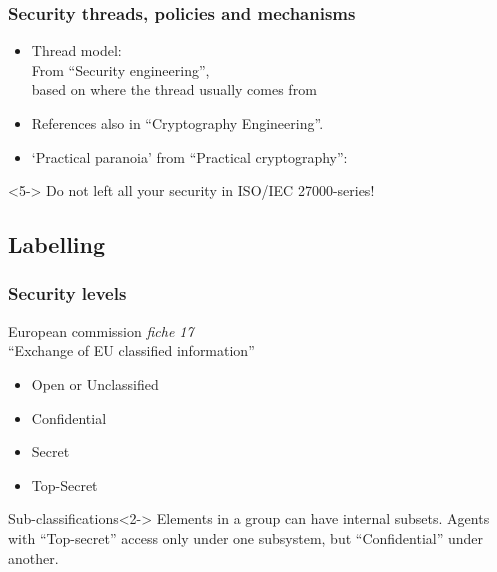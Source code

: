 \documentclass{beamer}
\begin{document}
\begin{frame}
\frametitle{Security threads, policies and mechanisms}
    \begin{itemize}
        \item Thread model:\\From ``Security engineering''\cite{SecEngRossAnderson},\\based on where the thread usually comes from
        \item<3-> References also in ``Cryptography Engineering''\cite{cryptoEngineering}.
        \item<4-> `Practical paranoia' from ``Practical cryptography''\cite{PractCryptoSchneier}:
    \end{itemize}
    \begin{alertblock}{}<5->
        Do not left all your security in ISO/IEC 27000-series!
    \end{alertblock}
\end{frame}

\subsection{Labelling}

\begin{frame}
\frametitle{Security levels}
    European commission \emph{fiche 17} \\``Exchange of EU classified information'' \cite{fiche17EU}
    \begin{itemize}
        \item Open or Unclassified
        \item Confidential
        \item Secret
        \item Top-Secret
    \end{itemize}
   \begin{exampleblock}{Sub-classifications}<2->
       Elements in a group can have internal subsets. Agents with ``Top-secret'' access only under one subsystem, but ``Confidential'' under another.
   \end{exampleblock}
\end{frame}
\end{document}
